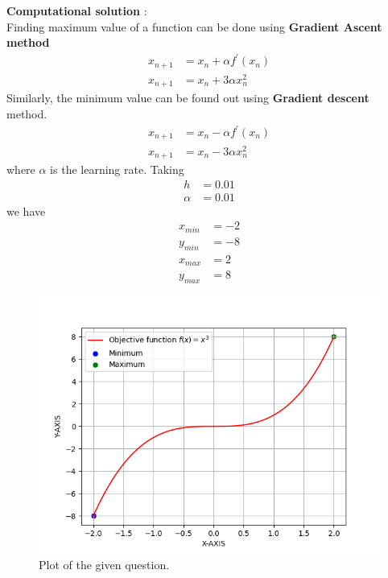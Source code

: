 \documentclass[journal]{IEEEtran}
\begin{document}
\textbf{Computational solution} : \\

Finding maximum value of a function can be done using \textbf{Gradient Ascent method} \\
\begin{align}
	x_{n+1} &= x_{n} + \alpha f^{\prime} (x_{n}) \\
	x_{n+1} &= x_{n} + 3 \alpha x_{n}^2
\end{align}
Similarly, the minimum value can be found out using \textbf{Gradient descent} method. \\
\begin{align}
	x_{n+1} &= x_{n} - \alpha f^{\prime} (x_{n}) \\
	x_{n+1} &= x_{n} - 3 \alpha x_{n}^2
\end{align}
where $\alpha$ is the learning rate.
Taking
\begin{align}
	h &= 0.01 \\
	\alpha &= 0.01
\end{align}
we have
\begin{align}
	x_{min} &= -2 \\
	y_{min} &= -8 \\
	x_{max} &= 2 \\
	y_{max} &= 8
\end{align}

\begin{figure}[h]
\centering
\includegraphics[width=\columnwidth]{figs/fig.png}
\caption{Plot of the given question.}
\label{fig:Plot1} 
\end{figure}
\end{document}
